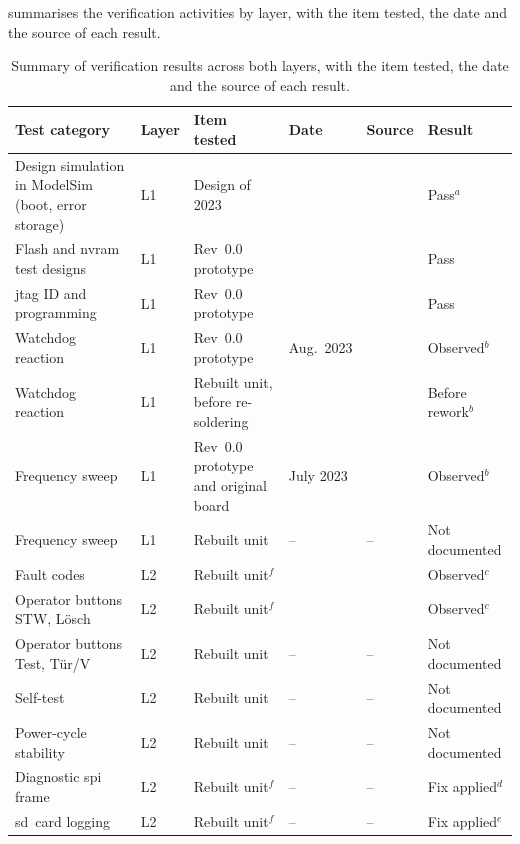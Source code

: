  summarises the verification activities by layer, with the item tested, the date and the source of each result.

\begin{table}[htbp]
	\centering
	\caption[Summary of Verification Results]{Summary of verification results across both layers, with the item tested, the date and the source of each result.}
	\label{tab:results_summary}
	\small
	\setlength{\tabcolsep}{4pt}
	\begin{tabular}{@{}>{\raggedright\arraybackslash}p{} l >{\raggedright\arraybackslash}p{} >{\raggedright\arraybackslash}p{} >{\raggedright\arraybackslash}p{} >{\raggedright\arraybackslash}p{}@{}}
		\toprule
		Test category & Layer & Item tested & Date & Source & Result \\
		\midrule
		Design simulation in ModelSim (boot, error storage) & L1 & Design of 2023 & 2023 & \cite[Sec.~5.1]{leyer2023} & Pass$^{a}$ \\
		Flash and \gls{nvram} test designs & L1 & Rev~0.0 prototype & 2023 & \cite[Sec.~4.3--4.4]{leyer2023} & Pass \\
		\gls{jtag} ID and programming & L1 & Rev~0.0 prototype & 2023 & \cite[Sec.~4.1]{leyer2023} & Pass \\
		Watchdog reaction & L1 & Rev~0.0 prototype & Aug.\ 2023 & \cite[Sec.~4.6]{leyer2023} & Observed$^{b}$ \\
		Watchdog reaction & L1 & Rebuilt unit, before re-soldering & 2025 & \cite[p.~13]{savchuk2025} & Before rework$^{b}$ \\
		Frequency sweep & L1 & Rev~0.0 prototype and original board & July 2023 & \cite[Sec.~4.10]{leyer2023} & Observed$^{b}$ \\
		Frequency sweep & L1 & Rebuilt unit & -- & -- & Not documented \\
		Fault codes & L2 & Rebuilt unit$^{f}$ & 2025 & \cite[p.~15]{savchuk2025} & Observed$^{c}$ \\
		Operator buttons STW, Lösch & L2 & Rebuilt unit$^{f}$ & 2025 & \cite[pp.~14--15]{savchuk2025} & Observed$^{c}$ \\
		Operator buttons Test, Tür/V & L2 & Rebuilt unit & -- & -- & Not documented \\
		Self-test & L2 & Rebuilt unit & -- & -- & Not documented \\
		Power-cycle stability & L2 & Rebuilt unit & -- & -- & Not documented \\
		Diagnostic \gls{spi} frame & L2 & Rebuilt unit$^{f}$ & -- & -- & Fix applied$^{d}$ \\
		\gls{sd}~card logging & L2 & Rebuilt unit$^{f}$ & -- & -- & Fix applied$^{e}$ \\
		\bottomrule
	\end{tabular}


\end{table}

